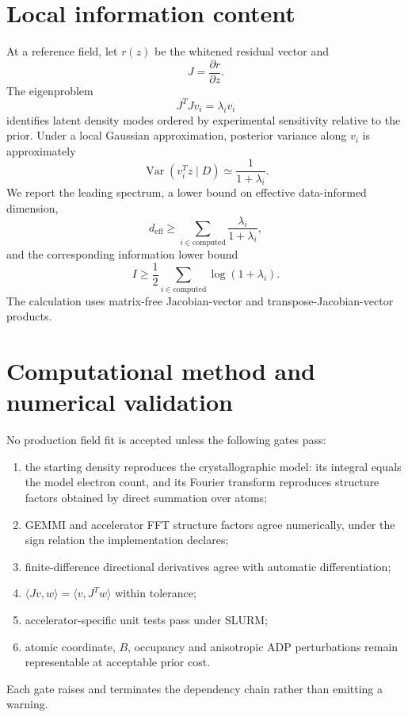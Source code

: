 \documentclass[11pt]{article}
\begin{document}
\section{Local information content}
At a reference field, let $r(z)$ be the whitened residual vector and
\begin{equation}
  J=\frac{\partial r}{\partial z}.
\end{equation}
The eigenproblem
\begin{equation}
  J^T J v_i=\lambda_i v_i
\end{equation}
identifies latent density modes ordered by experimental sensitivity relative to the prior. Under a local Gaussian approximation, posterior variance along $v_i$ is approximately
\begin{equation}
  \operatorname{Var}(v_i^Tz\mid D)\simeq\frac{1}{1+\lambda_i}.
\end{equation}
We report the leading spectrum, a lower bound on effective data-informed dimension,
\begin{equation}
  d_{\mathrm{eff}}\geq\sum_{i\in\mathrm{computed}}\frac{\lambda_i}{1+\lambda_i},
\end{equation}
and the corresponding information lower bound
\begin{equation}
  I\geq\frac12\sum_{i\in\mathrm{computed}}\log(1+\lambda_i).
\end{equation}
The calculation uses matrix-free Jacobian-vector and transpose-Jacobian-vector products.

\section{Computational method and numerical validation}
\label{sec:numerics}
No production field fit is accepted unless the following gates pass:
\begin{enumerate}[nosep]
  \item the starting density reproduces the crystallographic model: its integral equals the
    model electron count, and its Fourier transform reproduces structure factors obtained by
    direct summation over atoms;
  \item GEMMI and accelerator FFT structure factors agree numerically, under the sign
    relation the implementation declares;
  \item finite-difference directional derivatives agree with automatic differentiation;
  \item $\langle Jv,w\rangle=\langle v,J^Tw\rangle$ within tolerance;
  \item accelerator-specific unit tests pass under SLURM;
  \item atomic coordinate, $B$, occupancy and anisotropic ADP perturbations remain
    representable at acceptable prior cost.
\end{enumerate}
Each gate raises and terminates the dependency chain rather than emitting a warning.
\end{document}
